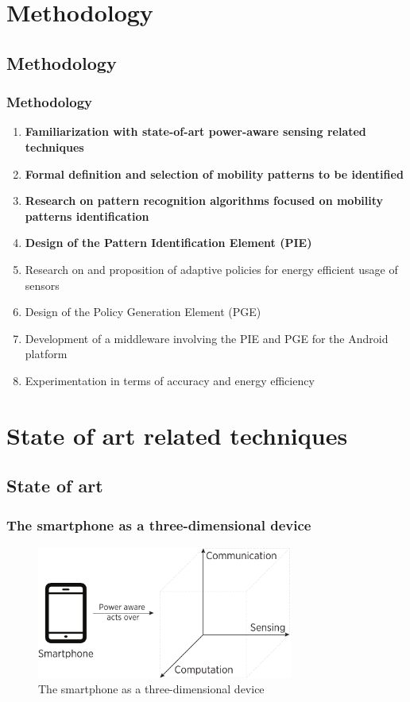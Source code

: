 \documentclass[compress,9pt,xcolor={dvipsnames,table}]{beamer}
\begin{document}
\section{Methodology}
\subsection{Methodology}
\begin{frame}\frametitle{Methodology}
\begin{enumerate}
  \item \textbf{Familiarization with state-of-art power-aware sensing related techniques}
  \item \textbf{Formal definition and selection of mobility patterns to be identified}
  \item \textbf{Research on pattern recognition algorithms focused on mobility patterns identification}
  \item \textbf{Design of the Pattern Identification Element (PIE)}
  \item Research on and proposition of adaptive policies for energy efficient usage of sensors
  \item Design of the Policy Generation Element (PGE)
  \item Development of a middleware involving the PIE and PGE for the Android platform
  \item Experimentation in terms of accuracy and energy efficiency
\end{enumerate}
\end{frame}


\section[State-of-art]{State of art related techniques}
\subsection{State of art}

\begin{frame}\frametitle{The smartphone as a three-dimensional device}
\begin{figure}[tb]
  \centering
  \includegraphics[width=0.75\textwidth]{../../../resources/images/vectors/smartphone-dimensions}
  \caption{The smartphone as a three-dimensional device}
  \label{fig:smartphone-three-dimensional}
\end{figure}
\end{frame}
\end{document}
